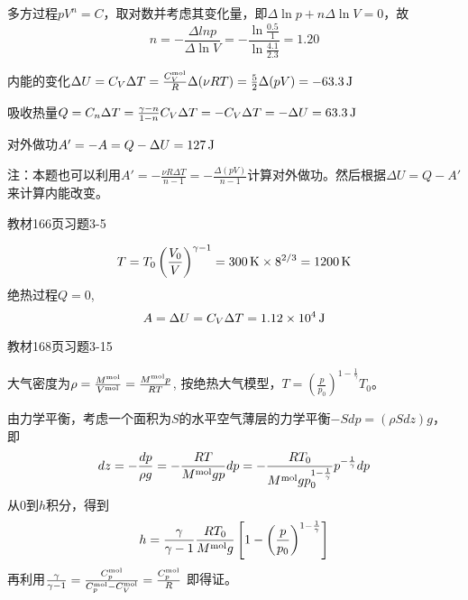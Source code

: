 \documentclass[CJK]{beamer}
\begin{document}
\begin{frame}
  \bch
      {\small
        \bitem
      \item{
        多方过程$pV^n = C$，取对数并考虑其变化量，即$\Delta \ln p + n \Delta \ln V = 0$，故
        $$n = - \frac{\Delta ln p}{\Delta \ln V} = -\frac{\ln\frac{0.5}{1}}{\ln\frac{4.1}{2.3}} = 1.20 $$}
      \item{内能的变化$\Delta U  = C_V\Delta T = \frac{C_V^{\rm mol}}{R}\Delta (\nu RT) = \frac{5}{2}\Delta(pV) = -63.3\,\mathrm{J}$}
      \item{吸收热量$Q = C_n \Delta T = \frac{\gamma-n}{1-n}C_V\Delta T = -C_V\Delta T = -\Delta U = 63.3\,\mathrm{J}$}
      \item{对外做功$A'=-A = Q-\Delta U = 127\,\mathrm{J}$}
        \eitem
        \skipline
        
注：本题也可以利用$A' = -\frac{\nu R \Delta T}{n-1} =-\frac{\Delta(pV)}{n-1}$计算对外做功。然后根据$\Delta U = Q-A'$来计算内能改变。        
  }
  \ech
\end{frame}

\begin{frame}
  \bch
  教材166页习题3-5
  \ech
\end{frame}

\begin{frame}
  \bch
  $$T=T_0\left(\frac{V_0}{V}\right)^{\gamma-1} = 300\,\mathrm{K}\times 8^{2/3} = 1200\,\mathrm{K} $$
  绝热过程$Q=0$,
  $$A = \Delta U =C_V\Delta T  = 1.12\times 10^4\,\mathrm{J}$$
  \ech
\end{frame}

\begin{frame}
  \bch
  教材168页习题3-15
  \ech
\end{frame}

\begin{frame}
  \bch
  {\small
    大气密度为$ \rho = \frac{M^{\rm mol}}{V^{\rm mol}} = \frac{M^{\rm mol}p}{RT} $,   按绝热大气模型，$T = \left(\frac{p}{p_0}\right)^{1-\frac{1}{\gamma}} T_0$。
    
  由力学平衡，考虑一个面积为$S$的水平空气薄层的力学平衡$-S dp = (\rho S dz)g $， 即
  $$ dz =-\frac{dp}{\rho g} = -\frac{RT }{M^{\rm mol}gp}dp= -\frac{RT_0}{M^{\rm mol}gp_0^{1-\frac{1}{\gamma}}} p^{-\frac{1}{\gamma}} dp$$
  从$0$到$h$积分，得到
  $$ h = \frac{\gamma}{\gamma-1}\frac{RT_0}{M^{\rm mol}g}\left[1-\left(\frac{p}{p_0}\right)^{1-\frac{1}{\gamma}}\right]$$
  再利用$\frac{\gamma}{\gamma-1} = \frac{C_p^{\rm mol}}{C_p^{\rm mol}-C_V^{\rm mol}} = \frac{C_p^{\rm mol}}{R}$
    即得证。
  }
  \ech
\end{frame}
\end{document}
